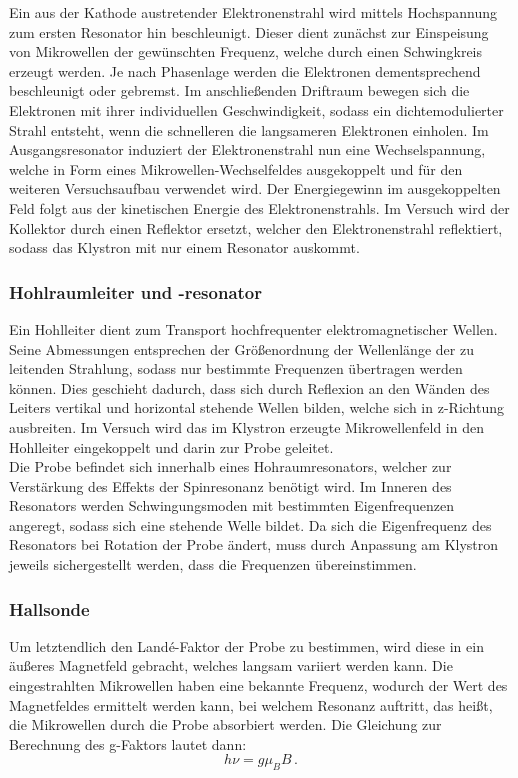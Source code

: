 \documentclass{scrartcl}
\begin{document}
Ein aus der Kathode austretender Elektronenstrahl wird mittels Hochspannung zum ersten Resonator hin beschleunigt. Dieser dient zunächst zur Einspeisung von Mikrowellen der gewünschten Frequenz, welche  durch einen Schwingkreis erzeugt werden. Je nach Phasenlage werden die Elektronen dementsprechend beschleunigt oder gebremst. Im anschließenden Driftraum bewegen sich die Elektronen mit ihrer individuellen Geschwindigkeit, sodass ein dichtemodulierter Strahl entsteht, wenn die schnelleren die langsameren Elektronen einholen. Im Ausgangsresonator induziert der Elektronenstrahl nun eine Wechselspannung, welche in Form eines Mikrowellen-Wechselfeldes ausgekoppelt und für den weiteren Versuchsaufbau verwendet wird. Der Energiegewinn im ausgekoppelten Feld folgt aus der kinetischen Energie des Elektronenstrahls. Im Versuch wird der Kollektor durch einen Reflektor ersetzt, welcher den Elektronenstrahl reflektiert, sodass das Klystron mit nur einem Resonator auskommt.


\subsubsection{Hohlraumleiter und -resonator}
Ein Hohlleiter dient zum Transport hochfrequenter elektromagnetischer Wellen. Seine Abmessungen entsprechen der Größenordnung der Wellenlänge der zu leitenden Strahlung, sodass nur bestimmte Frequenzen übertragen werden können. Dies geschieht dadurch, dass sich durch Reflexion an den Wänden des Leiters vertikal und horizontal stehende Wellen bilden, welche sich in z-Richtung ausbreiten. Im Versuch wird das im Klystron erzeugte Mikrowellenfeld in den Hohlleiter eingekoppelt und darin zur Probe geleitet. \\

Die Probe befindet sich innerhalb eines Hohraumresonators, welcher zur Verstärkung des Effekts der Spinresonanz benötigt wird. Im Inneren des Resonators werden Schwingungsmoden mit bestimmten Eigenfrequenzen angeregt, sodass sich eine stehende Welle bildet. Da sich die Eigenfrequenz des Resonators bei Rotation der Probe ändert, muss durch Anpassung am Klystron jeweils sichergestellt werden, dass die Frequenzen übereinstimmen.

\subsubsection{Hallsonde}

Um letztendlich den Landé-Faktor der Probe zu bestimmen, wird diese in ein äußeres Magnetfeld gebracht, welches langsam variiert werden kann. Die eingestrahlten Mikrowellen haben eine bekannte Frequenz, wodurch der Wert des Magnetfeldes ermittelt werden kann, bei welchem Resonanz auftritt, das heißt, die Mikrowellen durch die Probe absorbiert werden. Die Gleichung zur Berechnung des g-Faktors lautet dann:
\begin{equation}
    h \nu = g \mu_B B \, .
\end{equation} 
\end{document}
